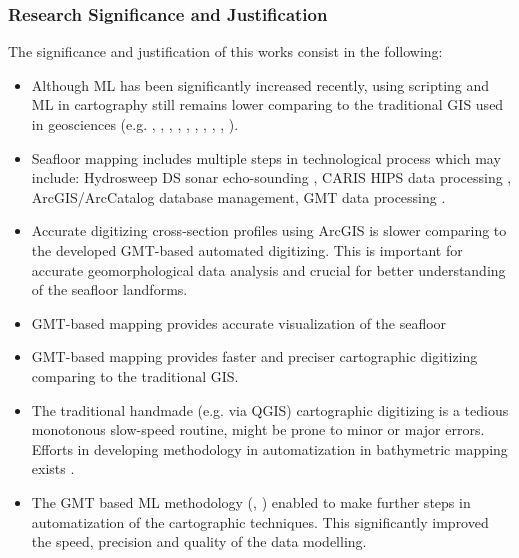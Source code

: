 \documentclass[pdflatex,compress,8pt,
	xcolor={dvipsnames,dvipsnames,svgnames,x11names,table},
	hyperref={colorlinks = true,breaklinks = true, urlcolor = NavyBlue, breaklinks = true}]{beamer}
\begin{document}
\begin{frame}\frametitle{Research Significance and Justification}
The significance and justification of this works consist in the following:

\begin{itemize}
         \item Although ML has been significantly increased recently, using scripting and ML in cartography still remains lower comparing to the traditional GIS used in geosciences (e.g. \cite{Lemenkova2005b2}, \cite{RID09251802355041}, \cite{RID:0925180235504-2}, \cite{Lemenkova2014d}, \cite{Lemenkova2011c}, \cite{Lemenkova2005a}, \cite{Lemenkova2012j}, \cite{Lemenkova2007c}, \cite{Lemenkova2012d}, \cite{Lemenkova2012g}). 
         \item Seafloor mapping includes multiple steps in technological process which may include: Hydrosweep DS sonar echo-sounding \cite{Lemenkova201569}, CARIS HIPS data processing \cite{Lemenkova2007f}, ArcGIS/ArcCatalog database management, GMT data processing \cite{Lemenkova201565}. 
	\item Accurate digitizing cross-section profiles using ArcGIS is slower comparing to the developed GMT-based automated digitizing. This is important for accurate geomorphological data analysis and crucial for better understanding of the seafloor landforms. 
	\item GMT-based mapping provides accurate visualization of the seafloor \cite{Lemenkova2007f}
	\item GMT-based mapping provides faster and preciser cartographic digitizing comparing to the traditional GIS. 
	\item The traditional handmade (e.g. via QGIS) cartographic digitizing is a tedious monotonous slow-speed routine, might be prone to minor or major errors. Efforts in developing methodology in automatization in bathymetric mapping exists \cite{Lemenkova2008b}. 
	\item The GMT based ML methodology (\cite{Wessel2019}, \cite{Wessel2018}) enabled to make further steps in automatization of the cartographic techniques. This significantly improved the speed, precision and quality of the data modelling.	
\end{itemize}

\end{frame}
\end{document}
